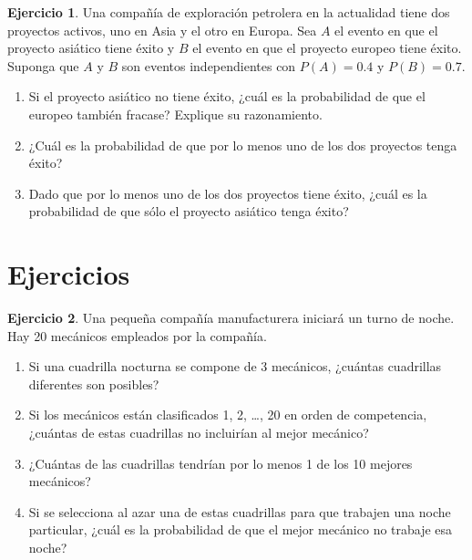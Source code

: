 \documentclass[
  11pt,
]{book}
\theoremstyle{definition}
\theoremstyle{definition}
\theoremstyle{definition}
\newtheorem{exercise}{Ejercicio}[chapter]
\theoremstyle{definition}
\theoremstyle{remark}
\begin{document}
\begin{exercise}

Una compañía de exploración petrolera en la actualidad tiene dos proyectos activos, uno en Asia y el otro en Europa. Sea \(A\) el evento en que el proyecto asiático tiene éxito y \(B\) el evento en que el proyecto europeo tiene éxito. Suponga que \(A\) y \(B\) son eventos independientes con \(P(A) = 0.4\) y \(P(B) = 0.7\).

\begin{enumerate}
\def\labelenumi{\alph{enumi}.}
\item
  Si el proyecto asiático no tiene éxito, ¿cuál es la probabilidad de que el europeo también fracase? Explique su razonamiento.
\item
  ¿Cuál es la probabilidad de que por lo menos uno de los dos proyectos tenga éxito?
\item
  Dado que por lo menos uno de los dos proyectos tiene éxito, ¿cuál es la probabilidad de que sólo el proyecto asiático tenga éxito?
\end{enumerate}

\end{exercise}

\section{Ejercicios}\label{ejercicios-1}

\begin{exercise}

Una pequeña compañía manufacturera iniciará un turno de noche. Hay 20 mecánicos empleados por la compañía.

\begin{enumerate}
\def\labelenumi{\alph{enumi}.}
\item
  Si una cuadrilla nocturna se compone de 3 mecánicos, ¿cuántas cuadrillas diferentes son posibles?
\item
  Si los mecánicos están clasificados 1, 2, \ldots, 20 en orden de competencia, ¿cuántas de estas cuadrillas no incluirían al mejor mecánico?
\item
  ¿Cuántas de las cuadrillas tendrían por lo menos 1 de los 10 mejores mecánicos?
\item
  Si se selecciona al azar una de estas cuadrillas para que trabajen una noche particular, ¿cuál es la probabilidad de que el mejor mecánico no trabaje esa noche?\\
\end{enumerate}

\end{exercise}
\end{document}
